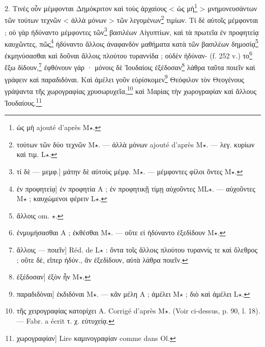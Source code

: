 \documentclass[landscape, a4paper, 11pt, oneside, polutonikogreek, french]{article}
\begin{document}
2. Τινὲς οὖν μέμφονται Δημόκριτον καὶ τοὺς ἀρχαίους < ὡς μὴ\footnote{ὡς μὴ ajouté d'après M$\star$.} > μνημονευσάντων τῶν τούτων τεχνῶν < ἀλλὰ μόνων > τῶν λεγομένων\footnote{τούτων τῶν δύο τεχνῶν M$\star$. --- ἀλλὰ μόνων ajouté d'après M$\star$. --- λεγ. κυρίων καὶ τιμ. L$\star$.} τιμίων. Τί δὲ αὐτοῖς μέμφονται ; οὐ γὰρ ἠδύναντο μέμφοντες τῶν\footnote{τί δὲ --- μεμφ.] μάτην δὲ αὐτοὺς μέμφ. M$\star$. --- μέμφοντες φίλοι ὄντες M$\star$.} βασιλέων Αἰγυπτίων, καὶ τὰ πρωτεῖα ἐν προφητείᾳ καυχῶντες, πῶς\footnote{ἐν προφητείᾳ] ἐν προφητία A ; ἐν προφητικῇ τίμῃ αὐχοῦντες ML$\star$. --- αὐχοῦντες M$\star$ ; καυχώμενοι φέρειν L$\star$.} ἠδύναντο ἄλλοις ἀναφανδὸν μαθήματα κατὰ τῶν βασιλέων δημοσίᾳ\footnote{ἄλλοις om. $\star$.} ἐκμηνύσασθαι καὶ δοῦναι ἄλλοις πλούτου τυραννίδα ; οὐδὲν ἠδύναν- (f. 252 v.) το\footnote{ἐνμυμήσασθαι A ; ἐκθέσθαι M$\star$. --- οὔτε εἰ ἠδύναντο ἐξεδίδουν M$\star$.} ἔξω δίδουν,\footnote{ἄλλοις --- ποιεῖν] Réd. de L$\star$ : ὄντα τοῖς ἄλλοις πλούτου τυραννίς τε καὶ ὄλεθρος ; οὔτε δὲ, εἴπερ ἠδύν., ἂν ἐξεδίδουν, αὐτὰ λάθρα ποιεῖν.} ἐφθόνουν γάρ · μόνοις δὲ Ἰουδαίοις ἐξέδοσαν\footnote{ἐξέδοσαν] ἐξὸν ἦν M$\star$.} λάθρα ταῦτα ποιεῖν καὶ γράφειν καὶ παραδιδόναι. Καὶ ἀμέλει γοῦν εὑρίσκομεν\footnote{παραδιδὸναι] ἐκδιδόναι M$\star$. --- κἂν μέλη A ; ἀμέλει M$\star$ ; διὸ καὶ ἀμέλει L$\star$.} Θεόφιλον τὸν Θεογένους γράψαντα τῆς χωρογραφίας χρυσωρυχεῖα,\footnote{τῆς χειρογραφίας κατορίχει A. Corrigé d'après M$\star$. (Voir ci-dessus, p. 90, l. 18). --- Fabr. a écrit τ. χ. εὐτυχείᾳ.} καὶ Μαρίας τὴν χωρογραφίαν καὶ ἄλλους Ἰουδαίους.\footnote{χωρογραφίαν] Lire καμινογραφίαν comme dans Ol.}
\end{document}
